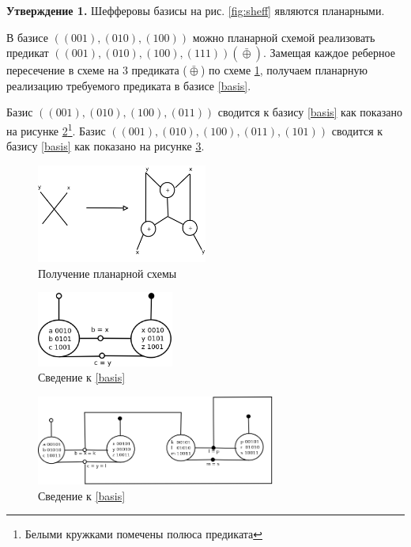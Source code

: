 \documentclass[12pt]{article}
\begin{document}
\textbf{Утверждение 1.} Шефферовы базисы на рис. \ref{fig:sheff} являются планарными.

В базисе $((001), (010), (100))$ \label{basis} можно планарной схемой реализовать предикат 
$((001), (010), (100), (111)) (\bar{\oplus})$. Замещая каждое реберное пересечение в схеме на 
3 предиката ($\bar{\oplus}$) по схеме \ref{fig:xor}, получаем планарную реализацию требуемого предиката
в базисе \ref{basis}.

Базис $((001), (010), (100), (011))$ сводится к базису \ref{basis} как показано на рисунке 
\ref{fig:scheff4}\footnote{Белыми кружками помечены полюса предиката}.
Базис $((001), (010), (100), (011), (101))$ сводится к базису \ref{basis} как показано на рисунке \ref{fig:scheff5}. 

\begin{figure}[htb]
\centering
\includegraphics[width=0.5\textwidth]{intersection.png}
\caption{Получение планарной схемы}
\label{fig:xor}
\end{figure}


\begin{figure}[htb]
\centering
\includegraphics[width=0.4\textwidth]{scheff4.png}
\caption{Сведение к \ref{basis}}
\label{fig:scheff4}
\end{figure}


\begin{figure}[htb]
\centering
\includegraphics[width=0.7\textwidth]{scheff5.png}
\caption{Сведение к \ref{basis}}
\label{fig:scheff5}
\end{figure}
\end{document}
